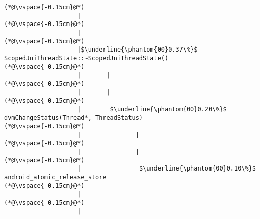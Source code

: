 \begin{lstlisting}[caption=Metodikutsu C$\to$Java 20 viiteparametrilla, label=profile:C2JBenchmark00206, numberbychapter=true, frame=lines, float, floatplacement=t]
(*@\vspace{-0.15cm}@*)
                    |
(*@\vspace{-0.15cm}@*)
                    |
(*@\vspace{-0.15cm}@*)
                    |$\underline{\phantom{00}0.37\%}$ ScopedJniThreadState::~ScopedJniThreadState()
(*@\vspace{-0.15cm}@*)
                    |       |
(*@\vspace{-0.15cm}@*)
                    |       |
(*@\vspace{-0.15cm}@*)
                    |        $\underline{\phantom{00}0.20\%}$ dvmChangeStatus(Thread*, ThreadStatus)
(*@\vspace{-0.15cm}@*)
                    |               |
(*@\vspace{-0.15cm}@*)
                    |               |
(*@\vspace{-0.15cm}@*)
                    |                $\underline{\phantom{00}0.10\%}$ android_atomic_release_store
(*@\vspace{-0.15cm}@*)
                    |
(*@\vspace{-0.15cm}@*)
                    |

\end{lstlisting}

